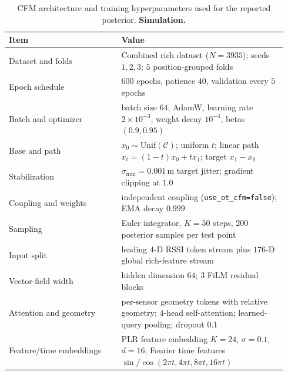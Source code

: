 \begin{table}[t]
\centering
\caption{CFM architecture and training hyperparameters used for the reported posterior. \textbf{Simulation.}}
\label{tab:cfm-hparams}
\scriptsize
\setlength{\tabcolsep}{3pt}
\begin{tabular}{@{}p{0.38\linewidth}p{0.56\linewidth}@{}}
\toprule
Item & Value \\
\midrule
Dataset and folds & Combined rich dataset ($N=3935$); seeds $1,2,3$; $5$ position-grouped folds \\ %
Epoch schedule & $600$ epochs, patience $40$, validation every $5$ epochs \\ %
Batch and optimizer & batch size $64$; AdamW, learning rate $2{\times}10^{-3}$, weight decay $10^{-4}$, betas $(0.9,0.95)$ \\ %
Base and path & $x_0\sim\mathrm{Unif}(\mathcal{C})$; uniform $t$; linear path $x_t=(1-t)x_0+t x_1$; target $x_1-x_0$ \\ %
Stabilization & $\sigma_{\min}=0.001$\,m target jitter; gradient clipping at $1.0$ \\ %
Coupling and weights & independent coupling (\texttt{use\_ot\_cfm=false}); EMA decay $0.999$ \\ %
Sampling & Euler integrator, $K=50$ steps, $200$ posterior samples per test point \\ %
Input split & leading $4$-D RSSI token stream plus $176$-D global rich-feature stream \\ %
Vector-field width & hidden dimension $64$; $3$ FiLM residual blocks \\ %
Attention and geometry & per-sensor geometry tokens with relative geometry; $4$-head self-attention; learned-query pooling; dropout $0.1$ \\ %
Feature/time embeddings & PLR feature embedding $K=24$, $\sigma=0.1$, $d=16$; Fourier time features $\sin/\cos(2\pi t,4\pi t,8\pi t,16\pi t)$ \\ %
\bottomrule
\end{tabular}
\end{table}

